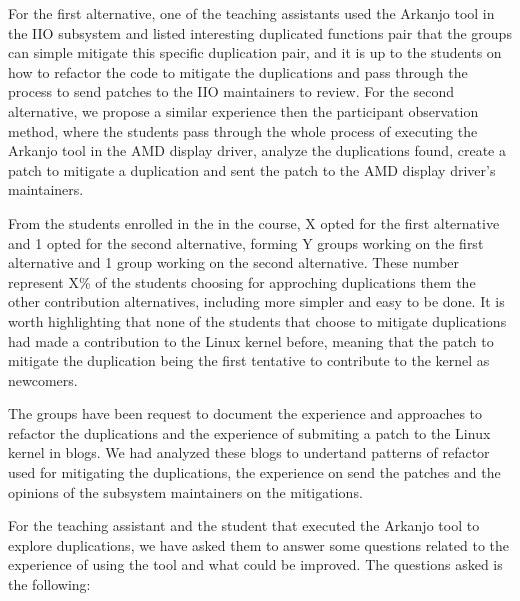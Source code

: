 For the first alternative, one of the teaching assistants used the Arkanjo tool in the IIO subsystem and
listed interesting duplicated functions pair that the groups can simple mitigate this specific duplication pair, 
and it is up to the students on how
to refactor the code to mitigate the duplications and pass through the process to send patches to the IIO 
maintainers to review. For the second alternative, we propose a similar experience then the 
participant observation method, where the students pass through the whole process of executing the Arkanjo tool
in the AMD display driver, analyze the duplications found, create a patch to mitigate a duplication and sent
the patch to the AMD display driver's maintainers.

From the students enrolled in the in the course, X opted for the first alternative and 1 opted for the second
alternative, forming Y groups working on the first alternative and 1 group working on the second alternative. 
These number represent X\% of the students choosing for approching duplications them the other contribution 
alternatives, including more simpler and easy to be done.  It is worth highlighting that none of the students
that choose to mitigate duplications had made a contribution to the Linux kernel before,
meaning that the patch to mitigate the duplication being the first tentative to contribute to the kernel as
newcomers.

The groups have been request to document the experience and approaches to refactor the duplications and the
experience of submiting a patch to the Linux kernel in blogs. We had analyzed these blogs to undertand 
patterns of refactor used for mitigating the duplications, the experience on send the patches and the 
opinions of the subsystem maintainers on the mitigations. 

For the teaching assistant and the student that executed the Arkanjo tool to explore duplications, 
we have asked them to answer some questions related to the experience of using the tool and what could be
improved. The questions asked is the following: 


